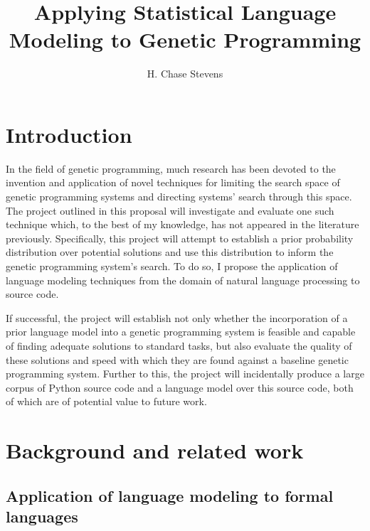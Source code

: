 \documentclass[a4paper,11pt]{proposal}
\title{Applying Statistical Language Modeling to Genetic Programming}
\author{H. Chase Stevens}
\begin{document}
\maketitle 
\parindent=0mm


\setcounter{tocdepth}{2}

\clearpage

\newpage


\setlength{\parskip}{1ex} 


\section{Introduction} \label{sec:intro}

In the field of genetic programming, much research has been devoted to the invention and application of novel techniques for limiting the search space of genetic programming systems and directing systems' search through this space. The project outlined in this proposal will investigate and evaluate one such technique which, to the best of my knowledge, has not appeared in the literature previously. Specifically, this project will attempt to establish a prior probability distribution over potential solutions and use this distribution to inform the genetic programming system's search. To do so, I propose the application of language modeling techniques from the domain of natural language processing to source code. 

If successful, the project will establish not only whether the incorporation of a prior language model into a genetic programming system is feasible and capable of finding adequate solutions to standard tasks, but also evaluate the quality of these solutions and speed with which they are found against a baseline genetic programming system. Further to this, the project will incidentally produce a large corpus of Python source code and a language model over this source code, both of which are of potential value to future work. 

\section{Background and related work} \label{sec:back}

\subsection{Application of language modeling to formal languages}
\end{document}
